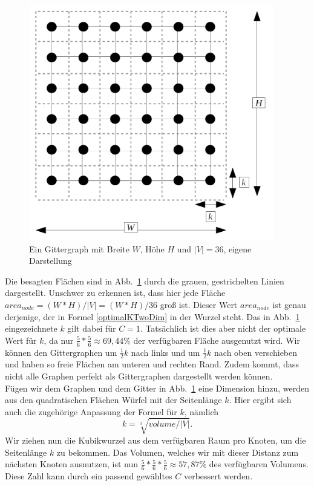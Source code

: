 \documentclass[12pt, a4paper]{article}
\begin{document}
\begin{figure}[h!]
\centering
\includegraphics[width=0.95\textwidth]{gridGraphOptimalDistance.png}
\caption[Ein Gittergraph mit Breite $W$,  Höhe $H$ und $|V|=36$]{Ein Gittergraph mit Breite $W$,  Höhe $H$ und $|V|=36$, eigene Darstellung}
\label{gridGraphOptimalDistance}
\end{figure}

Die besagten Flächen sind in Abb.~\ref{gridGraphOptimalDistance} durch die grauen, gestrichelten Linien dargestellt. Unschwer zu erkennen ist, dass hier jede Fläche $area_{node} = (W*H)/|V| = (W*H)/36$ groß ist. Dieser Wert $area_{node}$ ist genau derjenige, der in Formel \eqref{optimalKTwoDim} in der Wurzel steht. Das in Abb.~\ref{gridGraphOptimalDistance} eingezeichnete $k$ gilt dabei für $C=1$. Tatsächlich ist dies aber nicht der optimale Wert für $k$, da nur $\frac{5}{6}*\frac{5}{6} \approx 69,44\%$ der verfügbaren Fläche ausgenutzt wird. Wir können den Gittergraphen um $\frac{1}{2}k$ nach links und um $\frac{1}{2}k$ nach oben verschieben und haben so freie Flächen am unteren und rechten Rand. Zudem kommt, dass nicht alle Graphen perfekt als Gittergraphen dargestellt werden können.\\

Fügen wir dem Graphen und dem Gitter in Abb.~\ref{gridGraphOptimalDistance} eine Dimension hinzu, werden aus den quadratischen Flächen Würfel mit der Seitenlänge $k$. Hier ergibt sich auch die zugehörige Anpassung der Formel für $k$, nämlich
\begin{equation} \label{optimalKThreeDim}
k =\sqrt[3]{volume/|V|}.
\end{equation}
Wir ziehen nun die Kubikwurzel aus dem verfügbaren Raum pro Knoten, um die Seitenlänge $k$ zu bekommen. Das Volumen, welches wir mit dieser Distanz zum nächsten Knoten ausnutzen, ist nun $\frac{5}{6}*\frac{5}{6}*\frac{5}{6} \approx 57,87\%$ des verfügbaren Volumens. Diese Zahl kann durch ein passend gewähltes $C$ verbessert werden.\\
\end{document}
